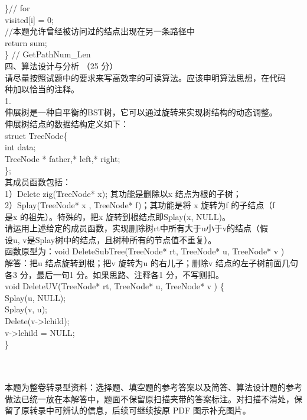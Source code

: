 \begin{question}
\}// for\\
visited[i] = 0;\\
//本题允许曾经被访问过的结点出现在另一条路径中\\
return sum;\\
\} // GetPathNum\_Len\\
四、算法设计与分析 （25 分）\\
请尽量按照试题中的要求来写高效率的可读算法。应该申明算法思想，在代码\\
种加以恰当的注释。\\
1.\\
伸展树是一种自平衡的BST树，它可以通过旋转来实现树结构的动态调整。\\
伸展树结点的数据结构定义如下：\\
struct TreeNode\{\\
int  data;\\
TreeNode  * father,* left,* right;\\
\};\\
其成员函数包括：\\
1）Delete zig(TreeNode* x); 其功能是删除以x 结点为根的子树；\\
2）Splay(TreeNode* x , TreeNode* f)；其功能是将 x 旋转为f 的子结点（f\\
是x 的祖先）。特殊的，把x 旋转到根结点即Splay(x, NULL)。\\
请运用上述给定的成员函数，实现删除树rt中所有大于u小于v的结点（假\\
设u, v是Splay树中的结点，且树种所有的节点值不重复）。\\
函数原型为：void DeleteSubTree(TreeNode* rt, TreeNode* u, TreeNode* v )\\
解答：把u 结点旋转到根；把v 旋转为u 的右儿子；删除v 结点的左子树前面几句\\
各3 分，最后一句1 分。如果思路、注释各1 分，不写则扣。\\
void DeleteUV(TreeNode* rt, TreeNode* u, TreeNode* v ) \{\\
Splay(u, NULL);\\
Splay(v, u);\\
Delete(v->lchild);\\
v->lchild = NULL;\\
\}\\
\\
\

\begin{solution}
本题为整卷转录型资料：选择题、填空题的参考答案以及简答、算法设计题的参考做法已统一放在本解答中，题面不保留原扫描夹带的答案标注。对扫描不清处，保留了原转录中可辨认的信息，后续可继续按原 PDF 图示补充图片。


\end{solution}
\end{question}
